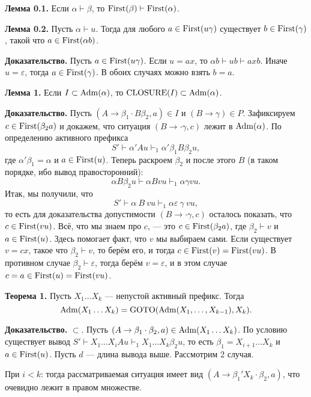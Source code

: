 \textbf{Лемма 0.1.} Если $\alpha \vdash \beta$, то $\operatorname{First}(\beta) \vdash \operatorname{First}(\alpha)$.

\textbf{Лемма 0.2.} Пусть $\alpha \vdash u$. Тогда для любого $a \in \operatorname{First}(u \gamma)$ существует $b \in \operatorname{First}(\gamma)$, такой что $a \in \operatorname{First}(\alpha b)$.

\textbf{Доказательство.} Пусть $a \in \operatorname{First}(u \gamma)$.
Если $u = ax$, то $\alpha b \vdash ub \vdash axb$.
Иначе $u = \varepsilon$, тогда $a \in \operatorname{First}(\gamma)$.
В обоих случаях можно взять $b = a$.

\textbf{Лемма 1.} Если $I \subset \operatorname{Adm}(\alpha)$, то $\operatorname{CLOSURE}(I) \subset \operatorname{Adm}(\alpha)$.

\textbf{Доказательство.} Пусть $(A \to \beta_1 \cdot B \beta_2, a) \in I$ и $(B \to \gamma) \in P$.
Зафиксируем $c \in \operatorname{First}(\beta_2 a)$ и докажем, что ситуация $(B \to \cdot \gamma, c)$ лежит в $\operatorname{Adm}(\alpha)$.
По определению активного префикса
\[
    S' \vdash \alpha' Au \vdash_1 \alpha' \beta_1 B \beta_2 u,
\]
где $\alpha' \beta_1 = \alpha$ и $a \in \operatorname{First}(u)$.
Теперь раскроем $\beta_2$ и после этого $B$ (в таком порядке, ибо вывод правосторонний):
\[
    \alpha B \beta_2 u \vdash \alpha B vu \vdash_1 \alpha \gamma vu.
\]
Итак, мы получили, что
\[
    S' \vdash \alpha~B~vu \vdash_1 \alpha \varepsilon~\gamma~vu,
\]
то есть для доказательства допустимости $(B \to \cdot \gamma, c)$ осталось показать, что $c \in \operatorname{First}(vu)$.
Всё, что мы знаем про $c$, --- это $c \in \operatorname{First}(\beta_2 a)$, где $\beta_2 \vdash v$ и $a \in \operatorname{First}(u)$.
Здесь помогает факт, что $v$ мы выбираем сами.
Если существует $v = cx$, такое что $\beta_2 \vdash v$, то берём его, и тогда $c \in \operatorname{First}(v) = \operatorname{First}(vu)$.
В противном случае $\beta_2 \vdash \varepsilon$, тогда берём $v = \varepsilon$, и в этом случае $c = a \in \operatorname{First}(u) = \operatorname{First}(vu)$.

\QED

\textbf{Теорема 1.} Пусть $X_1 \dots X_k$ --- непустой активный префикс. Тогда
\[
    \operatorname{Adm}(X_1 \dots X_k) = \operatorname{GOTO}(\operatorname{Adm}(X_1, \dots, X_{k-1}), X_k).
\]

\textbf{Доказательство.} $\subset$. Пусть $(A \to \beta_1 \cdot \beta_2, a) \in \operatorname{Adm}(X_1 \dots X_k)$.
По условию существует вывод $S' \vdash X_1 \dots X_i A u \vdash_1 X_1 \dots X_k \beta_2 u$, то есть $\beta_1 = X_{i+1} \dots X_k$ и $a \in \operatorname{First}(u)$.
Пусть $d$ --- длина вывода выше.
Рассмотрим 2 случая.

При $i < k$: тогда рассматриваемая ситуация имеет вид $(A \to \beta_1' X_k \cdot \beta_2, a)$, что очевидно лежит в правом множестве.

